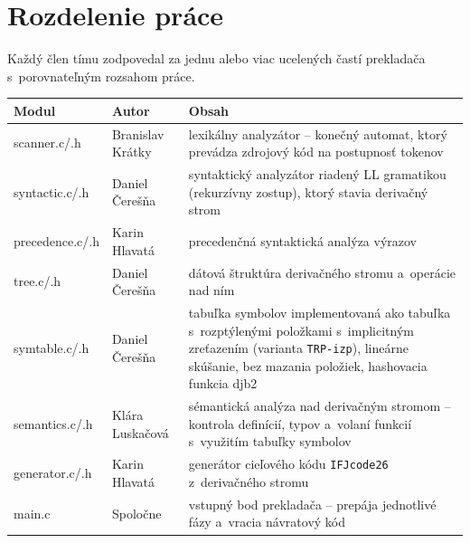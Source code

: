 \documentclass[11pt,a4paper]{article}
\begin{document}
\section{Rozdelenie práce}

Každý člen tímu zodpovedal za jednu alebo viac ucelených častí prekladača s~porovnateľným
rozsahom práce.

\begin{table}[h]
  \centering
  \renewcommand{\arraystretch}{1.25}
  \begin{tabularx}{\textwidth}{>{\ttfamily}l l >{\raggedright\arraybackslash}X}
    \toprule
    \normalfont\textbf{Modul} & \textbf{Autor} & \textbf{Obsah} \\
    \midrule
    scanner.c/.h    & Branislav Krátky & lexikálny analyzátor -- konečný automat,
                                         ktorý prevádza zdrojový kód na postupnosť tokenov \\
    syntactic.c/.h  & Daniel Čerešňa   & syntaktický analyzátor riadený LL gramatikou
                                         (rekurzívny zostup), ktorý stavia derivačný strom \\
    precedence.c/.h & Karin Hlavatá    & precedenčná syntaktická analýza výrazov \\
    tree.c/.h       & Daniel Čerešňa   & dátová štruktúra derivačného stromu
                                         a~operácie nad ním \\
    symtable.c/.h   & Daniel Čerešňa   & tabuľka symbolov implementovaná ako tabuľka s~rozptýlenými
                                         položkami s~implicitným zreťazením (varianta \texttt{TRP-izp}), lineárne skúšanie, bez mazania položiek,
                                         hashovacia funkcia djb2~\cite{djb2} \\
    semantics.c/.h  & Klára Luskačová  & sémantická analýza nad derivačným stromom -- kontrola definícií,
                                         typov a~volaní funkcií s~využitím tabuľky symbolov \\
    generator.c/.h  & Karin Hlavatá    & generátor cieľového kódu \texttt{IFJcode26} z~derivačného stromu \\
    main.c          & Spoločne & vstupný bod prekladača -- prepája jednotlivé fázy
                                          a~vracia návratový kód \\
    \bottomrule
  \end{tabularx}
\end{table}
\end{document}
